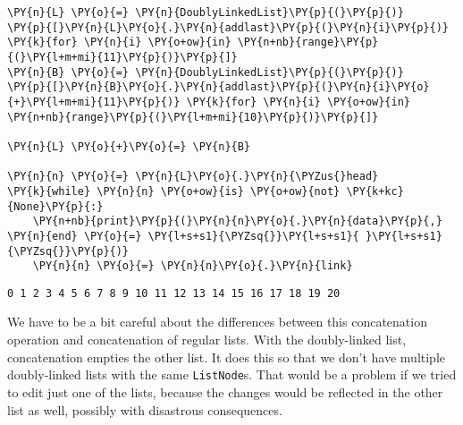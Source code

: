 \begin{Verbatim}[commandchars=\\\{\}]
\PY{n}{L} \PY{o}{=} \PY{n}{DoublyLinkedList}\PY{p}{(}\PY{p}{)}
\PY{p}{[}\PY{n}{L}\PY{o}{.}\PY{n}{addlast}\PY{p}{(}\PY{n}{i}\PY{p}{)} \PY{k}{for} \PY{n}{i} \PY{o+ow}{in} \PY{n+nb}{range}\PY{p}{(}\PY{l+m+mi}{11}\PY{p}{)}\PY{p}{]}
\PY{n}{B} \PY{o}{=} \PY{n}{DoublyLinkedList}\PY{p}{(}\PY{p}{)}
\PY{p}{[}\PY{n}{B}\PY{o}{.}\PY{n}{addlast}\PY{p}{(}\PY{n}{i}\PY{o}{+}\PY{l+m+mi}{11}\PY{p}{)} \PY{k}{for} \PY{n}{i} \PY{o+ow}{in} \PY{n+nb}{range}\PY{p}{(}\PY{l+m+mi}{10}\PY{p}{)}\PY{p}{]}

\PY{n}{L} \PY{o}{+}\PY{o}{=} \PY{n}{B}

\PY{n}{n} \PY{o}{=} \PY{n}{L}\PY{o}{.}\PY{n}{\PYZus{}head}
\PY{k}{while} \PY{n}{n} \PY{o+ow}{is} \PY{o+ow}{not} \PY{k+kc}{None}\PY{p}{:}
    \PY{n+nb}{print}\PY{p}{(}\PY{n}{n}\PY{o}{.}\PY{n}{data}\PY{p}{,} \PY{n}{end} \PY{o}{=} \PY{l+s+s1}{\PYZsq{}}\PY{l+s+s1}{ }\PY{l+s+s1}{\PYZsq{}}\PY{p}{)}
    \PY{n}{n} \PY{o}{=} \PY{n}{n}\PY{o}{.}\PY{n}{link}
\end{Verbatim}

\begin{Verbatim}
0 1 2 3 4 5 6 7 8 9 10 11 12 13 14 15 16 17 18 19 20 
\end{Verbatim}


We have to be a bit careful about the differences between this concatenation operation and concatenation of regular lists.  With the doubly-linked list, concatenation empties the other list.  It does this so that we don’t have multiple doubly-linked lists with the same \texttt{ListNode}s.    That would be a problem if we tried to edit just one of the lists, because the changes would be reflected in the other list as well, possibly with disastrous consequences.
